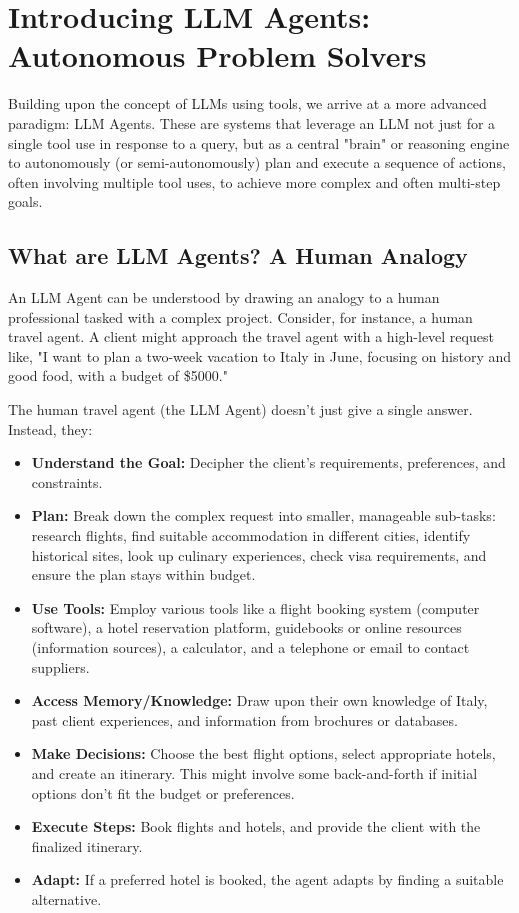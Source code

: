 \chapter{Introducing LLM Agents: Autonomous Problem Solvers}

Building upon the concept of LLMs using tools, we arrive at a more advanced paradigm: LLM Agents. 
These are systems that leverage an LLM not just for a single tool use in response to a query, but as a central "brain" or reasoning engine to autonomously
 (or semi-autonomously) plan and execute a sequence of actions, often involving multiple tool uses, to achieve more complex and often multi-step goals.

\section{What are LLM Agents? A Human Analogy}

An LLM Agent can be understood by drawing an analogy to a human professional tasked with a complex project. Consider, for instance, a human travel agent. 
A client might approach the travel agent with a high-level request like, "I want to plan a two-week vacation to Italy in June, focusing on history and good food,
 with a budget of \$5000."

The human travel agent (the LLM Agent) doesn't just give a single answer. Instead, they:

\begin{itemize}
    \item \textbf{Understand the Goal:} Decipher the client's requirements, preferences, and constraints.
    \item \textbf{Plan:} Break down the complex request into smaller, manageable sub-tasks: research flights, find suitable accommodation in different cities, 
    identify historical sites, look up culinary experiences, check visa requirements, and ensure the plan stays within budget.
    \item \textbf{Use Tools:} Employ various tools like a flight booking system (computer software), a hotel reservation platform, guidebooks or online resources 
    (information sources), a calculator, and a telephone or email to contact suppliers.
    \item \textbf{Access Memory/Knowledge:} Draw upon their own knowledge of Italy, past client experiences, and information from brochures or databases.
    \item \textbf{Make Decisions:} Choose the best flight options, select appropriate hotels, and create an itinerary. This might involve some back-and-forth 
    if initial options don't fit the budget or preferences.
    \item \textbf{Execute Steps:} Book flights and hotels, and provide the client with the finalized itinerary.
    \item \textbf{Adapt:} If a preferred hotel is booked, the agent adapts by finding a suitable alternative.
\end{itemize}

